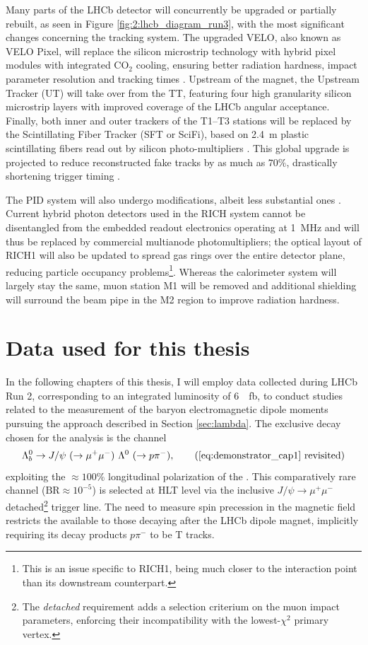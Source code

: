 Many parts of the LHCb detector will concurrently be upgraded or partially rebuilt, as seen in Figure \ref{fig:2:lhcb_diagram_run3}, with the most significant changes concerning the tracking system.
The upgraded VELO, also known as VELO Pixel, will replace the silicon microstrip technology with hybrid pixel modules with integrated CO$_2$ cooling, ensuring better radiation hardness, impact parameter resolution and tracking times \cite{Collaboration:1624070}.
Upstream of the magnet, the Upstream Tracker (UT) will take over from the TT, featuring four high granularity silicon microstrip layers with improved coverage of the LHCb angular acceptance. Finally, both inner and outer trackers of the T1--T3 stations will be replaced by the Scintillating Fiber Tracker (SFT or SciFi), based on \SI{2.4}{\meter} plastic scintillating fibers read out by silicon photo-multipliers \cite{Collaboration:1647400}.
This global upgrade is projected to reduce reconstructed fake tracks by as much as $70\%$, drastically shortening trigger timing \cite{Piucci_2017}.

The PID system will also undergo modifications, albeit less substantial ones \cite{Collaboration:1624074}.
Current hybrid photon detectors used in the RICH system cannot be disentangled from the embedded readout electronics operating at \SI{1}{\mega\hertz} and will thus be replaced by commercial multianode photomultipliers;
the optical layout of RICH1 will also be updated to spread gas rings over the entire detector plane, reducing particle occupancy problems\footnote{This is an issue specific to RICH1, being much closer to the interaction point than its downstream counterpart.}.
Whereas the calorimeter system will largely stay the same, muon station M1 will be removed and additional shielding will surround the beam pipe in the M2 region to improve radiation hardness.

\section{Data used for this thesis}
In the following chapters of this thesis, I will employ data collected during LHCb Run 2, corresponding to an integrated luminosity of \SI{6}{\per\femto\barn}, to conduct studies related to the measurement of the \lz baryon electromagnetic dipole moments pursuing the approach described in Section \ref{sec:lambda}.
The exclusive decay chosen for the analysis is the \lbz channel
\begin{equation*}
	\Lambda_b^0 \rightarrow J/\psi~(\rightarrow \mu^+ \mu^-)~\Lambda^0~(\rightarrow p \pi^-), \tag{\ref{eq:demonstrator_cap1} revisited}
\end{equation*}
exploiting the $\approx 100\%$ longitudinal polarization of the \lz.
This comparatively rare channel ($\text{BR} \approx {10}^{-5}$) is selected at HLT level via the inclusive $J/\psi \rightarrow \mu^+\mu^-$ detached\footnote{The \textit{detached} requirement adds a selection criterium on the muon impact parameters, enforcing their incompatibility with the lowest-$\chi^2$ primary vertex.} trigger line.
The need to measure spin precession in the magnetic field restricts the available \lz to those decaying after the LHCb dipole magnet, implicitly requiring its decay products $p\pi^-$ to be T tracks.

